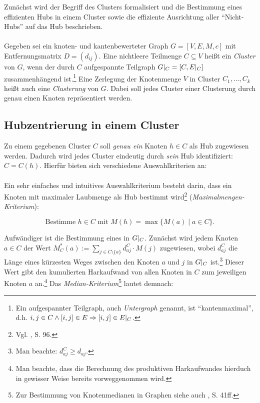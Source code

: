 \documentclass[fontsize=12pt,doubleside,openany,listof=totoc,listof=flat,listof=nochaptergap,numbers=noenddot]{scrbook}
\theoremstyle{style}
\begin{document}
Zunächst wird der Begriff des Clusters formalisiert und die Bestimmung eines effizienten Hubs in einem Cluster sowie die effiziente Ausrichtung aller "`Nicht-Hubs"' auf das Hub beschrieben.\\
\\
Gegeben sei ein knoten- und kantenbewerteter Graph $G=[V,E,M,c]$ mit Entfernungsmatrix $D=(d_{ij})$. Eine nichtleere Teilmenge $C \subseteq V$ heißt ein \textit{Cluster} von $G$, wenn der durch $C$ aufgespannte Teilgraph $G\arrowvert_C = [C,E\arrowvert_C]$ zusammenhängend ist.\footnote{Ein aufgespannter Teilgraph, auch \textit{Untergraph} genannt, ist "`kantenmaximal"', d.h. $i,j \in C \wedge [i,j] \in E \Rightarrow [i,j] \in E\arrowvert_C$.} Eine Zerlegung der Knotenmenge $V$ in Cluster $C_1,\dots,C_k$ heißt auch eine \textit{Clusterung} von $G$. Dabei soll jedes Cluster einer Clusterung durch genau einen Knoten repräsentiert werden.


\subsection{Hubzentrierung in einem Cluster}
\label{section_Hubzentrierung}

Zu einem gegebenen Cluster $C$ soll \textit{genau ein} Knoten $h \in C$ als Hub zugewiesen werden. Dadurch wird jedes Cluster eindeutig durch \textit{sein} Hub identifiziert: $C=C(h)$. Hierfür bieten sich verschiedene Auswahlkriterien an:\\
\\
Ein sehr einfaches und intuitives Auswahlkriterium besteht darin, dass ein Knoten mit maximaler Laubmenge als Hub bestimmt wird\footnote{Vgl. \cite{kruse_et_al}, S. 96.} (\textit{Maximalmengen-Kriterium}): 

\begin{equation}
\text{Bestimme } h \in C \text{ mit } M(h) = \max\{M(a) \mid a \in C\}.
\label{Maximalmengenkriterium}
\end{equation}

\noindent Aufwändiger ist die Bestimmung eines  in $G\arrowvert_C$. Zunächst wird jedem Knoten $a \in C$ der Wert $M^*_C(a) := \sum\limits_{j \in C\setminus \{a\}}d^C_{aj} \cdot M(j)$ zugewiesen, wobei $d^C_{aj}$ die Länge eines kürzesten Weges zwischen den Knoten $a$ und $j$ in $G\arrowvert_C$ ist.\footnote{Man beachte: $d^C_{aj} \geq d_{aj}$.} Dieser Wert gibt den kumulierten Harkaufwand von allen Knoten in $C$ zum jeweiligen Knoten $a$ an.\footnote{Man beachte, dass die Berechnung des produktiven Harkaufwandes hierduch in gewisser Weise bereits vorweggenommen wird.} Das \textit{Median-Kriterium}\footnote{Zur Bestimmung von Knotenmedianen in Graphen siehe auch \cite{domschke_drexl}, S. 41ff.} lautet demnach: 
\end{document}
